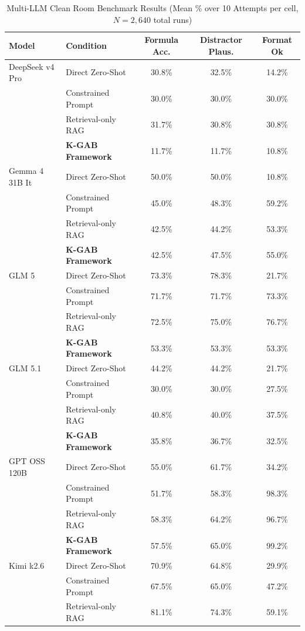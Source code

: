 \begin{table}[htbp]
\centering
\caption{Multi-LLM Clean Room Benchmark Results (Mean \% over 10 Attempts per cell, $N = 2,640$ total runs)}
\begin{tabular}{llccc}
\toprule
\textbf{Model} & \textbf{Condition} & \textbf{Formula Acc.} & \textbf{Distractor Plaus.} & \textbf{Format Ok} \\
\midrule
DeepSeek v4 Pro & Direct Zero-Shot & 30.8\% & 32.5\% & 14.2\% \\
 & Constrained Prompt & 30.0\% & 30.0\% & 30.0\% \\
 & Retrieval-only RAG & 31.7\% & 30.8\% & 30.8\% \\
 & \textbf{K-GAB Framework} & 11.7\% & 11.7\% & 10.8\% \\
\midrule
Gemma 4 31B It & Direct Zero-Shot & 50.0\% & 50.0\% & 10.8\% \\
 & Constrained Prompt & 45.0\% & 48.3\% & 59.2\% \\
 & Retrieval-only RAG & 42.5\% & 44.2\% & 53.3\% \\
 & \textbf{K-GAB Framework} & 42.5\% & 47.5\% & 55.0\% \\
\midrule
GLM 5 & Direct Zero-Shot & 73.3\% & 78.3\% & 21.7\% \\
 & Constrained Prompt & 71.7\% & 71.7\% & 73.3\% \\
 & Retrieval-only RAG & 72.5\% & 75.0\% & 76.7\% \\
 & \textbf{K-GAB Framework} & 53.3\% & 53.3\% & 53.3\% \\
\midrule
GLM 5.1 & Direct Zero-Shot & 44.2\% & 44.2\% & 21.7\% \\
 & Constrained Prompt & 30.0\% & 30.0\% & 27.5\% \\
 & Retrieval-only RAG & 40.8\% & 40.0\% & 37.5\% \\
 & \textbf{K-GAB Framework} & 35.8\% & 36.7\% & 32.5\% \\
\midrule
GPT OSS 120B & Direct Zero-Shot & 55.0\% & 61.7\% & 34.2\% \\
 & Constrained Prompt & 51.7\% & 58.3\% & 98.3\% \\
 & Retrieval-only RAG & 58.3\% & 64.2\% & 96.7\% \\
 & \textbf{K-GAB Framework} & 57.5\% & 65.0\% & 99.2\% \\
\midrule
Kimi k2.6 & Direct Zero-Shot & 70.9\% & 64.8\% & 29.9\% \\
 & Constrained Prompt & 67.5\% & 65.0\% & 47.2\% \\
 & Retrieval-only RAG & 81.1\% & 74.3\% & 59.1\% \\

\end{tabular}
\end{table}
